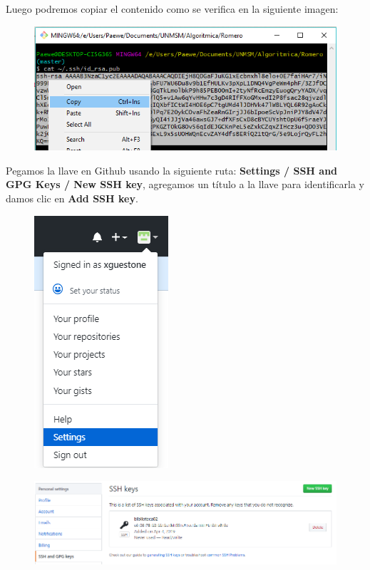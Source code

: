 \documentclass{article}
\begin{document}
Luego podremos copiar el contenido como se verifica en la siguiente imagen:

\begin{figure}[h!]
  \centering
  \includegraphics[scale=0.65]{./imagenes/Gitbash9.png}
\end{figure}

Pegamos la llave en Github usando la siguiente ruta: \textbf{Settings / SSH and
GPG Keys / New SSH key}, agregamos un título a la llave para identificarla y
damos clic en \textbf{Add SSH key}.

\begin{figure}[h!]
  \centering
  \includegraphics[scale=0.75]{./imagenes/Gitbash10.png}
\end{figure}

\begin{figure}[h!]
  \centering
  \includegraphics[scale=0.75]{./imagenes/Gitbash11.png}
\end{figure}
\end{document}
